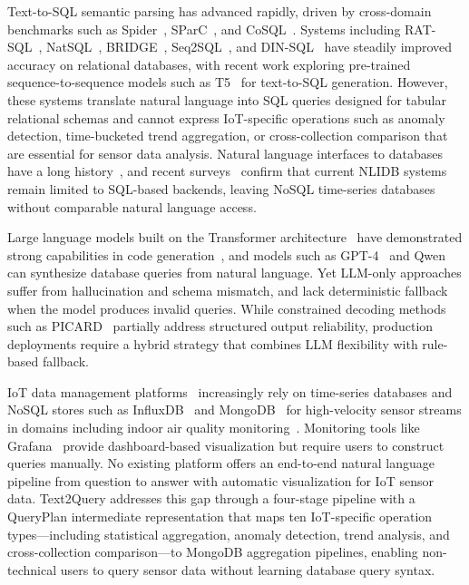 
Text-to-SQL semantic parsing has advanced rapidly, driven by cross-domain benchmarks such as Spider~\cite{yu2018spider}, SParC~\cite{yu2019sparc}, and CoSQL~\cite{yu2019cosql}. Systems including RAT-SQL~\cite{wang2020ratsql}, NatSQL~\cite{gan2021natsql}, BRIDGE~\cite{lin2020bridge}, Seq2SQL~\cite{zhong2017seq2sql}, and DIN-SQL~\cite{pourreza2024dinsql} have steadily improved accuracy on relational databases, with recent work exploring pre-trained sequence-to-sequence models such as T5~\cite{raffel2020t5,xie2022t5sql} for text-to-SQL generation. However, these systems translate natural language into SQL queries designed for tabular relational schemas and cannot express IoT-specific operations such as anomaly detection, time-bucketed trend aggregation, or cross-collection comparison that are essential for sensor data analysis. Natural language interfaces to databases have a long history~\cite{androutsopoulos1995nlidb,li2014constructing}, and recent surveys~\cite{affolter2019comparative,katsogiannis2023survey} confirm that current NLIDB systems remain limited to SQL-based backends, leaving NoSQL time-series databases without comparable natural language access.

Large language models built on the Transformer architecture~\cite{vaswani2017attention} have demonstrated strong capabilities in code generation~\cite{chen2021evaluating,touvron2023llama,roziere2023codellama,guo2024deepseekcoder}, and models such as GPT-4~\cite{openai2023gpt4} and Qwen~\cite{bai2023qwen} can synthesize database queries from natural language. Yet LLM-only approaches suffer from hallucination and schema mismatch, and lack deterministic fallback when the model produces invalid queries. While constrained decoding methods such as PICARD~\cite{scholak2021picard} partially address structured output reliability, production deployments require a hybrid strategy that combines LLM flexibility with rule-based fallback.

IoT data management platforms~\cite{gubbi2013iot,alfuqaha2015iot} increasingly rely on time-series databases and NoSQL stores such as InfluxDB~\cite{influxdb} and MongoDB~\cite{mongodb} for high-velocity sensor streams in domains including indoor air quality monitoring~\cite{who2010iaq}. Monitoring tools like Grafana~\cite{grafana} provide dashboard-based visualization but require users to construct queries manually. No existing platform offers an end-to-end natural language pipeline from question to answer with automatic visualization for IoT sensor data. Text2Query addresses this gap through a four-stage pipeline with a QueryPlan intermediate representation that maps ten IoT-specific operation types---including statistical aggregation, anomaly detection, trend analysis, and cross-collection comparison---to MongoDB aggregation pipelines, enabling non-technical users to query sensor data without learning database query syntax.
